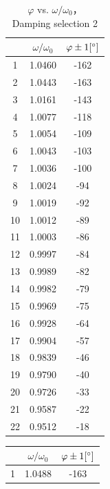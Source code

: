 \begin{figure}
  \centering
\begin{minipage}{0.45\textwidth}
\begin{table}[H]
\centering
\begin{tabular}{|c|c|c|}
\hline
& $\omega/\omega_0$ &  $\varphi \pm 1 [^\circ] $ \\ \hline
1  & 1.0460  & -162  \\ \hline
2  & 1.0443  & -163  \\ \hline
3  & 1.0161  & -143  \\ \hline
4  & 1.0077  & -118  \\ \hline
5  & 1.0054  & -109  \\ \hline
6  & 1.0043  & -103  \\ \hline
7  & 1.0036  & -100  \\ \hline
8  & 1.0024  & -94   \\ \hline
9  & 1.0019  & -92   \\ \hline
10 & 1.0012  & -89   \\ \hline
11 & 1.0003  & -86   \\ \hline
12 & 0.9997  & -84   \\ \hline
13 & 0.9989  & -82   \\ \hline
14 & 0.9982  & -79   \\ \hline
15 & 0.9969  & -75   \\ \hline
16 & 0.9928  & -64   \\ \hline
17 & 0.9904  & -57   \\ \hline
18 & 0.9839  & -46   \\ \hline
19 & 0.9790  & -40   \\ \hline
20 & 0.9726  & -33   \\ \hline
21 & 0.9587  & -22   \\ \hline
22 & 0.9512  & -18   \\ \hline
\end{tabular}    
\caption{$\varphi$ vs. $\omega/\omega_0$，\\ Damping selection 2}\label{data_phi2}
\end{table}
\end{minipage}
%
\begin{minipage}{0.45\textwidth}
\begin{table}[H]
\centering
\begin{tabular}{|c|c|c|}
\hline
& $\omega/\omega_0$ &  $\varphi \pm 1 [^\circ] $ \\ \hline
1  & 1.0488   & -163 \\ \hline

\end{tabular}
\end{table}
\end{minipage}
\end{figure}

